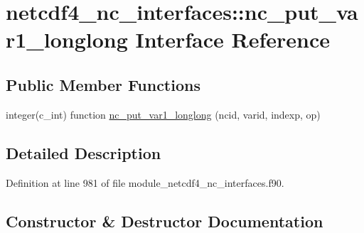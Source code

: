 \hypertarget{interfacenetcdf4__nc__interfaces_1_1nc__put__var1__longlong}{}\section{netcdf4\+\_\+nc\+\_\+interfaces\+:\+:nc\+\_\+put\+\_\+var1\+\_\+longlong Interface Reference}
\label{interfacenetcdf4__nc__interfaces_1_1nc__put__var1__longlong}
\subsection*{Public Member Functions}
\begin{DoxyCompactItemize}
\item 
integer(c\+\_\+int) function \hyperlink{interfacenetcdf4__nc__interfaces_1_1nc__put__var1__longlong_a0d717ffa78f93c0fde6daf062c77c439}{nc\+\_\+put\+\_\+var1\+\_\+longlong} (ncid, varid, indexp, op)
\end{DoxyCompactItemize}


\subsection{Detailed Description}


Definition at line 981 of file module\+\_\+netcdf4\+\_\+nc\+\_\+interfaces.\+f90.



\subsection{Constructor \& Destructor Documentation}
\mbox{\label{interfacenetcdf4__nc__interfaces_1_1nc__put__var1__longlong_a0d717ffa78f93c0fde6daf062c77c439}} 
